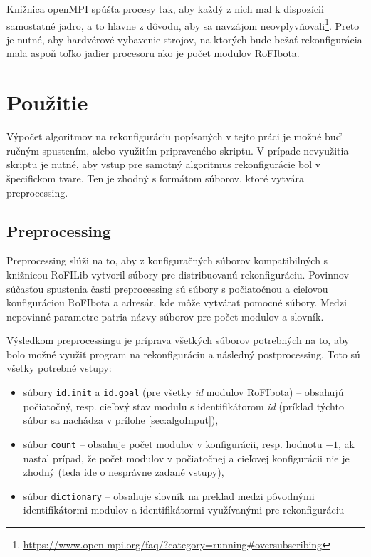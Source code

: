 \documentclass[
  digital, %
  oneside, %
  notable,   %
  lof,     %
  nolot,     %
]{fithesis3}
\begin{document}
Knižnica openMPI spúšťa procesy tak, aby každý z nich mal k dispozícii samostatné jadro, a to hlavne z dôvodu, aby sa navzájom neovplyvňovali\footnote{\url{https://www.open-mpi.org/faq/?category=running#oversubscribing}}. Preto je nutné, aby hardvérové vybavenie strojov, na ktorých bude bežať rekonfigurácia mala aspoň toľko jadier procesoru ako je počet modulov RoFIbota. 

\section{Použitie}
Výpočet algoritmov na rekonfiguráciu popísaných v tejto práci je možné buď ručným spustením, alebo využitím pripraveného skriptu. V prípade nevyužitia skriptu je nutné, aby vstup pre samotný algoritmus rekonfigurácie bol v špecifickom tvare. Ten je zhodný s formátom súborov, ktoré vytvára preprocessing.

\subsection{Preprocessing}
Preprocessing slúži na to, aby z konfiguračných súborov kompatibilných s knižnicou RoFILib vytvoril súbory pre distribuovanú rekonfiguráciu. Povinnov súčasťou spustenia časti preprocessing sú súbory s počiatočnou a cieľovou konfiguráciou RoFIbota a adresár, kde môže vytvárať pomocné súbory. Medzi nepovinné parametre patria názvy súborov pre počet modulov a slovník. 

Výsledkom preprocessingu je príprava všetkých súborov potrebných na to, aby bolo možné využiť program na rekonfiguráciu a následný postprocessing. Toto sú všetky potrebné vstupy: 
\begin{itemize}
    \item súbory \texttt{id.init} a \texttt{id.goal} (pre všetky \textit{id} modulov RoFIbota) -- obsahujú počiatočný, resp. cieľový stav modulu s identifikátorom \textit{id} (príklad týchto súbor sa nachádza v prílohe \ref{sec:algoInput}), 
    \item súbor \texttt{count} -- obsahuje počet modulov v konfigurácii, resp. hodnotu $-1$, ak nastal prípad, že počet modulov v počiatočnej a cieľovej konfigurácii nie je zhodný (teda ide o nesprávne zadané vstupy), 
    \item súbor \texttt{dictionary} -- obsahuje slovník na preklad medzi pôvodnými identifikátormi modulov a identifikátormi využívanými pre rekonfiguráciu
\end{itemize}
\end{document}
